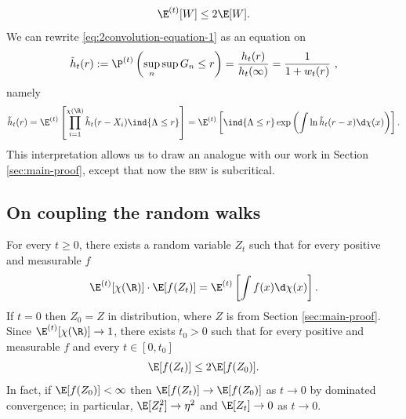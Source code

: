 \documentclass[10pt,a4paper]{article}
\newcommand{\brw}{\textsc{brw}\xspace}
\begin{document}
\begin{equation}\label{eq:bound-Et-by-2E}
\E^{(t)}[W] \leq 2\E[W] .
\end{equation}
We can rewrite \eqref{eq:2convolution-equation-1} as an equation on 
\[ \tilde h_t(r) := \P^{(t)}\left( \sup_n \sup G_n \leq r \right) = \frac{h_t(r)}{h_t(\infty)} = \frac{1}{1+w_t(r)} \ , \]
namely
\begin{equation}\label{eq:2convolution-equation-vol}
\tilde{h}_t(r) = \E^{(t)}\left[ \prod_{i=1}^{\chi(\R)} \tilde h_t(r-X_i) \ind{\Lambda\leq r} \right] = \E^{(t)}\left[ \ind{\Lambda\leq r} \exp\left( \int \ln\tilde h_t(r-x) \d\chi(x) \right) \right] . 
\end{equation}
This interpretation allows us to draw an analogue with our work in Section \ref{sec:main-proof}, except that now the \brw is subcritical. 






\subsection{On coupling the random walks}
\label{sec:2coupling-RW}





For every $t\geq 0$, there exists a random variable $Z_t$ such that for every positive and measurable $f$
\begin{equation}\label{eq:2def-Zt}
\E^{(t)}[\chi(\R)] \cdot \E[f(Z_t)] = \E^{(t)}\left[ \int f(x) \d\chi(x) \right] .
\end{equation}
If $t=0$ then $Z_0 =Z$ in distribution, where $Z$ is from Section \ref{sec:main-proof}. 
Since $\E^{(t)}[\chi(\R)] \to 1$, there exists $t_0>0$ such that 
for every positive and measurable $f$ and every $t\in [0,t_0]$
\[ \E[f(Z_t)] \leq 2 \E[f(Z_0)] . \]
In fact, if $\E[f(Z_0)]<\infty$ then $\E[f(Z_t)]\to \E[f(Z_0)]$ as $t\to 0$ by dominated convergence; in particular, $\E[Z_t^2] \to \eta^2$ and $\E[Z_t] \to 0$ as $t\to 0$. 
\end{document}
